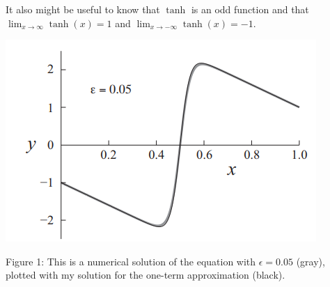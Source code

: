 \documentclass[10pt,letterpaper]{report}
\begin{document}
\begin{enumerate}
\begin{qbox}
It also might be useful to know that $\tanh$ is an odd function and that $\lim_{x\to\infty} \tanh(x) = 1$ and $\lim_{x\to-\infty} \tanh(x) = -1$.
\begin{center}
\includegraphics[height=0.3\textwidth]{img/2015F6.png}
\end{center}
Figure 1: This is a numerical solution of the equation with $\epsilon = 0.05$ (gray), plotted with my solution
for the one-term approximation (black).
\end{qbox}


\end{enumerate}
\end{document}
